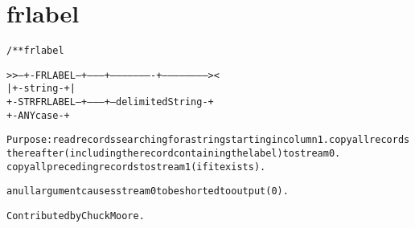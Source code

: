 \section{frlabel}
\begin{shaded}
\begin{alltt}
/** frlabel

   >>--+-FRLABEL--+--------+----------------------+-----------------------><
       |          +-string-+                      |
       +-STRFRLABEL--+---------+--delimitedString-+
                     +-ANYcase-+

  Purpose: read records searching for a string starting in column 1. copy all records
           thereafter (including the record containing the label) to stream 0.
           copy all preceding records to stream 1 (if it exists).

           a null argument causes stream 0 to be shorted to output (0).

  Contributed by Chuck Moore.

\end{alltt}
\end{shaded}
